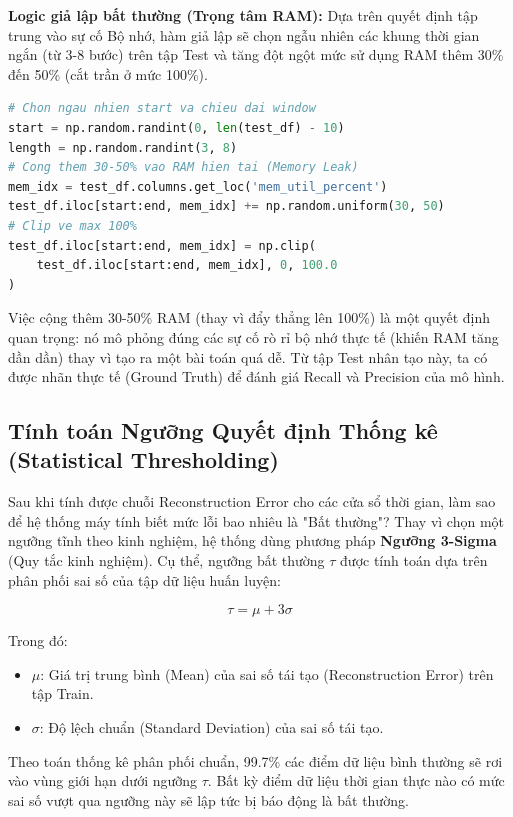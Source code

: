 \documentclass[12pt,a4paper]{article}
\begin{document}
\textbf{Logic giả lập bất thường (Trọng tâm RAM):}
Dựa trên quyết định tập trung vào sự cố Bộ nhớ, hàm giả lập sẽ chọn ngẫu nhiên các khung thời gian ngắn (từ 3-8 bước) trên tập Test và tăng đột ngột mức sử dụng RAM thêm 30\% đến 50\% (cắt trần ở mức 100\%).
\begin{lstlisting}[language=Python, title=Logic mô phỏng rò rỉ/tràn RAM]
# Chon ngau nhien start va chieu dai window
start = np.random.randint(0, len(test_df) - 10)
length = np.random.randint(3, 8) 
# Cong them 30-50% vao RAM hien tai (Memory Leak)
mem_idx = test_df.columns.get_loc('mem_util_percent')
test_df.iloc[start:end, mem_idx] += np.random.uniform(30, 50)
# Clip ve max 100%
test_df.iloc[start:end, mem_idx] = np.clip(
    test_df.iloc[start:end, mem_idx], 0, 100.0
)
\end{lstlisting}
Việc cộng thêm 30-50\% RAM (thay vì đẩy thẳng lên 100\%) là một quyết định quan trọng: nó mô phỏng đúng các sự cố rò rỉ bộ nhớ thực tế (khiến RAM tăng dần dần) thay vì tạo ra một bài toán quá dễ. Từ tập Test nhân tạo này, ta có được nhãn thực tế (Ground Truth) để đánh giá Recall và Precision của mô hình.

\subsection{Tính toán Ngưỡng Quyết định Thống kê (Statistical Thresholding)}
Sau khi tính được chuỗi Reconstruction Error cho các cửa sổ thời gian, làm sao để hệ thống máy tính biết mức lỗi bao nhiêu là "Bất thường"? Thay vì chọn một ngưỡng tĩnh theo kinh nghiệm, hệ thống dùng phương pháp \textbf{Ngưỡng 3-Sigma} (Quy tắc kinh nghiệm). Cụ thể, ngưỡng bất thường $\tau$ được tính toán dựa trên phân phối sai số của tập dữ liệu huấn luyện:

\begin{equation}
    \tau = \mu + 3\sigma
\end{equation}

Trong đó:
\begin{itemize}
    \item $\mu$: Giá trị trung bình (Mean) của sai số tái tạo (Reconstruction Error) trên tập Train.
    \item $\sigma$: Độ lệch chuẩn (Standard Deviation) của sai số tái tạo.
\end{itemize}

Theo toán thống kê phân phối chuẩn, 99.7\% các điểm dữ liệu bình thường sẽ rơi vào vùng giới hạn dưới ngưỡng $\tau$. Bất kỳ điểm dữ liệu thời gian thực nào có mức sai số vượt qua ngưỡng này sẽ lập tức bị báo động là bất thường.
\end{document}
